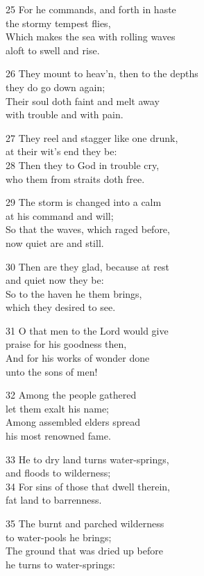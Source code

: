 25 For he commands, and forth in haste\\
the stormy tempest flies,\\
Which makes the sea with rolling waves\\
aloft to swell and rise.

26 They mount to heav’n, then to the depths\\
they do go down again;\\
Their soul doth faint and melt away\\
with trouble and with pain.

27 They reel and stagger like one drunk,\\
at their wit’s end they be:\\
28 Then they to God in trouble cry,\\
who them from straits doth free.

29 The storm is changed into a calm\\
at his command and will;\\
So that the waves, which raged before,\\
now quiet are and still.

30 Then are they glad, because at rest\\
and quiet now they be:\\
So to the haven he them brings,\\
which they desired to see.

31 O that men to the Lord would give\\
praise for his goodness then,\\
And for his works of wonder done\\
unto the sons of men!

32 Among the people gathered\\
let them exalt his name;\\
Among assembled elders spread\\
his most renowned fame.

33 He to dry land turns water-springs,\\
and floods to wilderness;\\
34 For sins of those that dwell therein,\\
fat land to barrenness.

35 The burnt and parched wilderness\\
to water-pools he brings;\\
The ground that was dried up before\\
he turns to water-springs:

